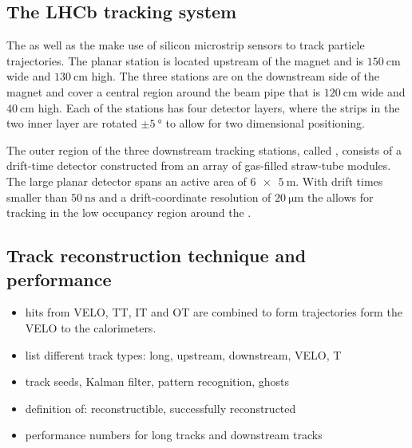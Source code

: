 \subsection{The \acs*{LHCb} tracking system}
\label{sec:lhcb_experiment:tracking:ttit}
\label{sec:lhcb_experiment:tracking:ot}

The \TT as well as the \IT make use of silicon microstrip sensors to track
particle trajectories. The planar \TT station is located upstream of the magnet
and is $\SI{150}{\centi\metre}$ wide and $\SI{130}{\centi\metre}$ high. The
three \IT stations are on the downstream side of the magnet and cover a central
region around the beam pipe that is $\SI{120}{\centi\metre}$ wide and
$\SI{40}{\centi\metre}$ high. Each of the stations has four detector layers,
where the strips in the two inner layer are rotated $\pm\SI{5}{\degree}$ to
allow for two dimensional positioning.

The outer region of the three downstream tracking stations, called \OT, consists
of a drift-time detector constructed from an array of gas-filled straw-tube
modules. The large planar detector spans an active area of $\SI[product-units =
power]{6 x 5}{\metre}$. With drift times smaller than $\SI{50}{\nano\second}$
and a drift-coordinate resolution of $\SI{20}{\micro\metre}$ the \OT allows for
tracking in the low occupancy region around the \IT.

\subsection{Track reconstruction technique and performance}
\label{sec:lhcb_experiment:tracking:techniques_and_performance}

\begin{itemize}
  \item hits from VELO, TT, IT and OT are combined to form trajectories form the VELO to the calorimeters. 
  \item list different track types: long, upstream, downstream, VELO, T
  \item track seeds, Kalman filter, pattern recognition, ghosts
  \item definition of: reconstructible, successfully reconstructed
  \item performance numbers for long tracks and downstream tracks
\end{itemize}

